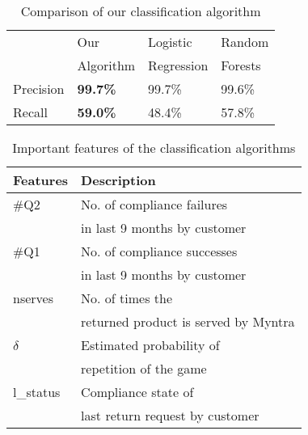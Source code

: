 \begin{table}[ht]
\centering
\begin{tabular}{|l|l|l|l|}
\hline
          & Our  & Logistic & Random \\
          & Algorithm & Regression & Forests \\ \hline
Precision & \textbf{99.7\%}              &     99.7\%                &    99.6\%        \\ \hline
Recall    & \textbf{59.0\%}            &     48.4\%            &   57.8\%            \\ \hline
\end{tabular}
\caption{Comparison of our classification algorithm}
\label{exp:analysis}
\end{table}


\begin{table}[ht]
\centering
\begin{tabular}{|l|l|}
\hline
\textbf{Features}                & \textbf{Description}                                                                 \\ \hline
\#Q2                         & No. of compliance failures \\
                            & in last 9 months by customer                                                                       \\ \hline
\#Q1                       & No. of compliance successes \\
                            & in last 9 months  by customer                                               \\ \hline
nserves          & No. of times the \\ 
                    & returned product is served by Myntra                                       \\ \hline
$\delta$                   & Estimated probability of \\
                            & repetition of the game                                                           \\ \hline
l\_status             & Compliance state of \\ 
                        & last return request by customer                                          \\ \hline
\end{tabular}
\caption{Important features of the classification algorithms}
\label{features}
\end{table}
